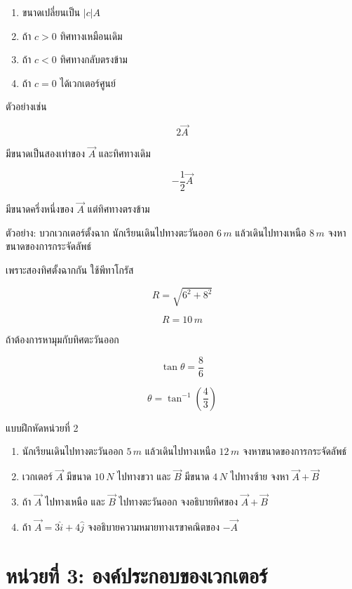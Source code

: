 \documentclass[12pt,a4paper]{report}
\begin{document}
\begin{enumerate}
    \item ขนาดเปลี่ยนเป็น $|c|A$
    \item ถ้า $c>0$ ทิศทางเหมือนเดิม
    \item ถ้า $c<0$ ทิศทางกลับตรงข้าม
    \item ถ้า $c=0$ ได้เวกเตอร์ศูนย์
\end{enumerate}

ตัวอย่างเช่น

\[
2\vec{A}
\]

มีขนาดเป็นสองเท่าของ $\vec{A}$ และทิศทางเดิม

\[
-\frac{1}{2}\vec{A}
\]

มีขนาดครึ่งหนึ่งของ $\vec{A}$ แต่ทิศทางตรงข้าม

\begin{examplebox}{ตัวอย่าง: บวกเวกเตอร์ตั้งฉาก}
นักเรียนเดินไปทางตะวันออก $6\,\si{m}$ แล้วเดินไปทางเหนือ $8\,\si{m}$ จงหาขนาดของการกระจัดลัพธ์

เพราะสองทิศตั้งฉากกัน ใช้พีทาโกรัส

\[
R=\sqrt{6^2+8^2}
\]

\[
R=10\,\si{m}
\]

ถ้าต้องการหามุมกับทิศตะวันออก

\[
\tan\theta=\frac{8}{6}
\]

\[
\theta=\tan^{-1}\left(\frac{4}{3}\right)
\]
\end{examplebox}

\begin{exercisebox}{แบบฝึกหัดหน่วยที่ 2}
\begin{enumerate}
    \item นักเรียนเดินไปทางตะวันออก $5\,\si{m}$ แล้วเดินไปทางเหนือ $12\,\si{m}$ จงหาขนาดของการกระจัดลัพธ์
    \item เวกเตอร์ $\vec{A}$ มีขนาด $10\,\si{N}$ ไปทางขวา และ $\vec{B}$ มีขนาด $4\,\si{N}$ ไปทางซ้าย จงหา $\vec{A}+\vec{B}$
    \item ถ้า $\vec{A}$ ไปทางเหนือ และ $\vec{B}$ ไปทางตะวันออก จงอธิบายทิศของ $\vec{A}+\vec{B}$
    \item ถ้า $\vec{A}=3\hat{i}+4\hat{j}$ จงอธิบายความหมายทางเรขาคณิตของ $-\vec{A}$
\end{enumerate}
\end{exercisebox}

\section{หน่วยที่ 3: องค์ประกอบของเวกเตอร์}
\end{document}
